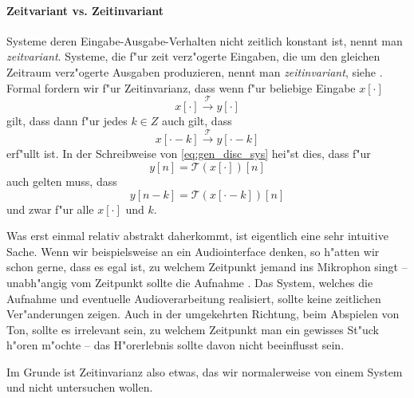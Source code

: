 \paragraph{Zeitvariant vs. Zeitinvariant} Systeme deren Eingabe-Ausgabe-Verhalten nicht zeitlich konstant ist, nennt man \emph{zeitvariant}.
Systeme, die f"ur zeit verz"ogerte Eingaben, die um den gleichen Zeitraum verz"ogerte Ausgaben produzieren, nennt man \emph{zeitinvariant}, siehe .
Formal fordern wir f"ur Zeitinvarianz, dass wenn f"ur beliebige Eingabe $x[\cdot]$
\[
x[\cdot] \overset{\mathcal{T}}{\rightarrow} y[\cdot]
\]
gilt, dass dann f"ur jedes $k \in Z$ auch gilt, dass
\[
x[\cdot -k] \overset{\mathcal{T}}{\rightarrow} y[\cdot - k]
\]
erf"ullt ist.
In der Schreibweise von \eqref{eq:gen_disc_sys} hei"st dies, dass f"ur 
\[
    y[n] = \mathcal{T}(x[\cdot])[n]
\]
auch gelten muss, dass
\[
    y[n - k] = \mathcal{T}(x[\cdot - k])[n]
\]
und zwar f"ur alle $x[\cdot]$ und $k$.

Was erst einmal relativ abstrakt daherkommt, ist eigentlich eine sehr intuitive Sache. 
Wenn wir beispielsweise an ein Audiointerface denken, so h"atten wir schon gerne, dass es egal ist, zu welchem Zeitpunkt jemand ins Mikrophon singt -- unabh"angig vom Zeitpunkt sollte die Aufnahme .
Das System, welches die Aufnahme und eventuelle Audioverarbeitung realisiert, sollte keine zeitlichen Ver"anderungen zeigen.
Auch in der umgekehrten Richtung, beim Abspielen von Ton, sollte es irrelevant sein, zu welchem Zeitpunkt man ein gewisses St"uck h"oren m"ochte -- das H"orerlebnis sollte davon nicht beeinflusst sein.

Im Grunde ist Zeitinvarianz also etwas, das wir normalerweise von einem System  und nicht untersuchen wollen.

